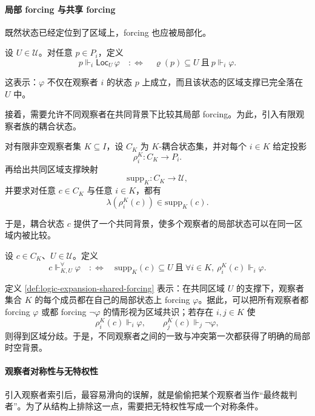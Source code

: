 \paragraph{局部 forcing 与共享 forcing}
既然状态已经定位到了区域上，forcing 也应被局部化。

\begin{definition}\label{def:logic-expansion-regional-local-forcing}
设 \(U\in \mathcal U\)。对任意 \(p\in P_i\)，定义
\[
p\Vdash_i \mathsf{Loc}_U\,\varphi
\quad:\Longleftrightarrow\quad
\varrho(p)\subseteq U
\ \text{且}\
p\Vdash_i \varphi.
\]
\end{definition}

这表示：\(\varphi\) 不仅在观察者 \(i\) 的状态 \(p\) 上成立，而且该状态的区域支撑已完全落在 \(U\) 中。

接着，需要允许不同观察者在共同背景下比较其局部 forcing。为此，引入有限观察者族的耦合状态。

\begin{definition}[耦合状态]\label{def:logic-expansion-coupled-states}
对有限非空观察者集 \(K\subseteq I\)，设 \(C_K\) 为 \(K\)-耦合状态集，并对每个 \(i\in K\) 给定投影
\[
\rho_i^K:C_K\to P_i.
\]
再给出共同区域支撑映射
\[
\mathrm{supp}_K:C_K\to \mathcal U,
\]
并要求对任意 \(c\in C_K\) 与任意 \(i\in K\)，都有
\[
\lambda(\rho_i^K(c))\in \mathrm{supp}_K(c).
\]
\end{definition}

于是，耦合状态 \(c\) 提供了一个共同背景，使多个观察者的局部状态可以在同一区域内被比较。

\begin{definition}[共享 forcing]\label{def:logic-expansion-shared-forcing}
设 \(c\in C_K\)、\(U\in \mathcal U\)。定义
\[
c\Vdash^{\forall}_{K,U}\varphi
\quad:\Longleftrightarrow\quad
\mathrm{supp}_K(c)\subseteq U
\ \text{且}\
\forall i\in K,\ \rho_i^K(c)\Vdash_i \varphi.
\]
\end{definition}

定义 \ref{def:logic-expansion-shared-forcing} 表示：在共同区域 \(U\) 的支撑下，观察者集合 \(K\) 的每个成员都在自己的局部状态上 forcing \(\varphi\)。据此，可以把所有观察者都 forcing \(\varphi\) 或都 forcing \(\neg\varphi\) 的情形视为区域共识；若存在 \(i,j\in K\) 使
\[
\rho_i^K(c)\Vdash_i \varphi,
\qquad
\rho_j^K(c)\Vdash_j \neg\varphi,
\]
则得到区域分歧。于是，不同观察者之间的一致与冲突第一次都获得了明确的局部时空背景。

\paragraph{观察者对称性与无特权性}
引入观察者索引后，最容易滑向的误解，就是偷偷把某个观察者当作“最终裁判者”。为了从结构上排除这一点，需要把无特权性写成一个对称条件。

